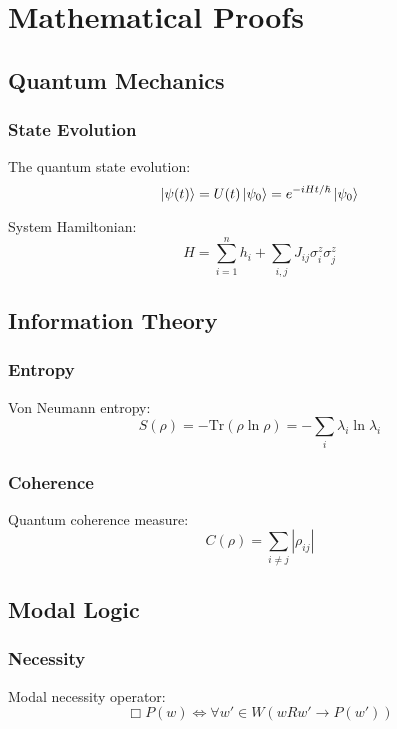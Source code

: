 \appendix
\section{Mathematical Proofs}\label{sec:appendix}

\subsection{Quantum Mechanics}

\subsubsection{State Evolution}
The quantum state evolution:
\begin{equation}
    \ket{\psi(t)} = U(t)\ket{\psi_0} = e^{-iHt/\hbar}\ket{\psi_0}
\end{equation}

System Hamiltonian:
\begin{equation}
    H = \sum_{i=1}^n h_i + \sum_{i,j} J_{ij}\sigma_i^z\sigma_j^z
\end{equation}

\subsection{Information Theory}

\subsubsection{Entropy}
Von Neumann entropy:
\begin{equation}
    S(\rho) = -\text{Tr}(\rho\ln\rho) = -\sum_i \lambda_i\ln\lambda_i
\end{equation}

\subsubsection{Coherence}
Quantum coherence measure:
\begin{equation}
    C(\rho) = \sum_{i\neq j} |\rho_{ij}|
\end{equation}

\subsection{Modal Logic}

\subsubsection{Necessity}
Modal necessity operator:
\begin{equation}
    \Box P(w) \iff \forall w' \in W(wRw' \rightarrow P(w'))
\end{equation}


